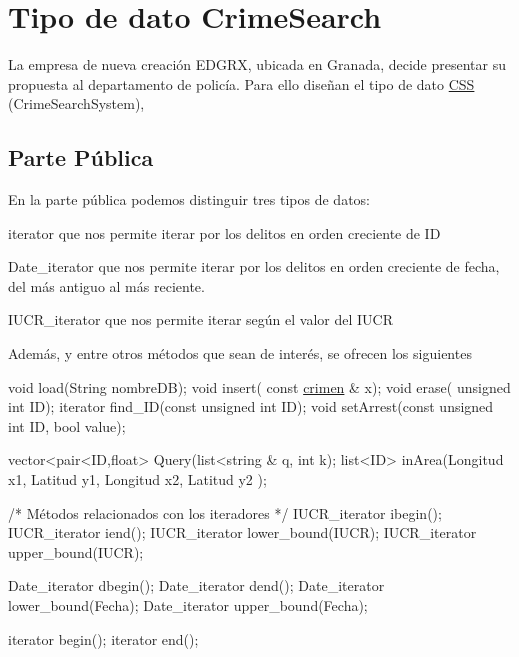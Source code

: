 \hypertarget{index_TDA}{}\section{Tipo de dato Crime\+Search}\label{index_TDA}
La empresa de nueva creación E\+D\+G\+R\+X, ubicada en Granada, decide presentar su propuesta al departamento de policía. Para ello diseñan el tipo de dato \hyperlink{classCSS}{C\+S\+S} (Crime\+Search\+System),\hypertarget{index_publico}{}\subsection{Parte Pública}\label{index_publico}
En la parte pública podemos distinguir tres tipos de datos\+:

\begin{DoxyItemize}
\item iterator que nos permite iterar por los delitos en orden creciente de I\+D \item Date\+\_\+iterator que nos permite iterar por los delitos en orden creciente de fecha, del más antiguo al más reciente. \item I\+U\+C\+R\+\_\+iterator que nos permite iterar según el valor del I\+U\+C\+R\end{DoxyItemize}
Además, y entre otros métodos que sean de interés, se ofrecen los siguientes


\begin{DoxyCode}
\textcolor{keywordtype}{void} load(String nombreDB);
\textcolor{keywordtype}{void} insert( \textcolor{keyword}{const} \hyperlink{classcrimen}{crimen} & x);
\textcolor{keywordtype}{void} erase( \textcolor{keywordtype}{unsigned} \textcolor{keywordtype}{int} ID);
iterator find\_ID(\textcolor{keyword}{const} \textcolor{keywordtype}{unsigned} \textcolor{keywordtype}{int} ID);
\textcolor{keywordtype}{void} setArrest(\textcolor{keyword}{const} \textcolor{keywordtype}{unsigned} \textcolor{keywordtype}{int} ID, \textcolor{keywordtype}{bool} value);

vector<pair<ID,float> Query(list<\textcolor{keywordtype}{string} & q, \textcolor{keywordtype}{int} k);    
list<ID> inArea(Longitud x1, Latitud y1, Longitud x2, Latitud y2 );

\textcolor{comment}{/* Métodos relacionados con los iteradores */}
IUCR\_iterator ibegin();
IUCR\_iterator iend();
IUCR\_iterator lower\_bound(IUCR);
IUCR\_iterator upper\_bound(IUCR);

Date\_iterator dbegin();
Date\_iterator dend();
Date\_iterator lower\_bound(Fecha);
Date\_iterator upper\_bound(Fecha);

iterator begin();
iterator end();
\end{DoxyCode}


